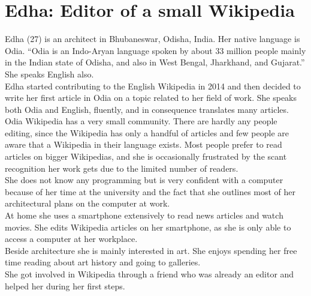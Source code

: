 \section{Edha: Editor of a small Wikipedia}
Edha (27) is an architect in Bhubaneswar, Odisha, India. Her native language is Odia. ``Odia is an Indo-Aryan language spoken by about 33 million people mainly in the Indian state of Odisha, and also in West Bengal, Jharkhand, and Gujarat.'' \citep{odia} She speaks English also.\\
Edha started contributing to the English Wikipedia in 2014 and then decided to write her first article in Odia on a topic related to her field of work. She speaks both Odia and English, fluently, and in consequence translates many articles. \\
Odia Wikipedia has a very small community. There are hardly any people editing, since the Wikipedia has only a handful of articles and few people are aware that a Wikipedia in their language exists. Most people prefer to read articles on bigger Wikipedias, and she is occasionally frustrated by the scant recognition her work gets due to the limited number of readers. \\
She does not know any programming but is very confident with a computer because of her time at the university and the fact that she outlines most of her architectural plans on the computer at work. \\
At home she uses a smartphone extensively to read news articles and watch movies. She edits Wikipedia articles on her smartphone, as she is only able to access a computer at her workplace. \\  
Beside architecture she is mainly interested in art. She enjoys spending her free time reading about art history and going to galleries. \\
She got involved in Wikipedia through a friend who was already an editor and helped her during her first steps.

